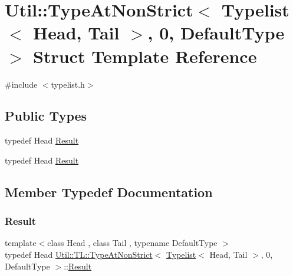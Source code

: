 \hypertarget{structUtil_1_1TL_1_1TypeAtNonStrict_3_01Typelist_3_01Head_00_01Tail_01_4_00_010_00_01DefaultType_01_4}{}\section{Util\+:\+:Type\+At\+Non\+Strict$<$ Typelist$<$ Head, Tail $>$, 0, Default\+Type $>$ Struct Template Reference}
\label{structUtil_1_1TL_1_1TypeAtNonStrict_3_01Typelist_3_01Head_00_01Tail_01_4_00_010_00_01DefaultType_01_4}


{\ttfamily \#include $<$typelist.\+h$>$}

\subsection*{Public Types}
\begin{DoxyCompactItemize}
\item 
typedef Head \mbox{\hyperlink{structUtil_1_1TL_1_1TypeAtNonStrict_3_01Typelist_3_01Head_00_01Tail_01_4_00_010_00_01DefaultType_01_4_a436fb34f639a42264d429c417d21785a}{Result}}
\item 
typedef Head \mbox{\hyperlink{structUtil_1_1TL_1_1TypeAtNonStrict_3_01Typelist_3_01Head_00_01Tail_01_4_00_010_00_01DefaultType_01_4_a436fb34f639a42264d429c417d21785a}{Result}}
\end{DoxyCompactItemize}


\subsection{Member Typedef Documentation}
\mbox{\label{structUtil_1_1TL_1_1TypeAtNonStrict_3_01Typelist_3_01Head_00_01Tail_01_4_00_010_00_01DefaultType_01_4_a436fb34f639a42264d429c417d21785a}} 
\subsubsection{\texorpdfstring{Result}{Result}\hspace{0.1cm}{\footnotesize\ttfamily [1/2]}}
{\footnotesize\ttfamily template$<$class Head , class Tail , typename Default\+Type $>$ \\
typedef Head \mbox{\hyperlink{structUtil_1_1TL_1_1TypeAtNonStrict}{Util\+::\+T\+L\+::\+Type\+At\+Non\+Strict}}$<$ \mbox{\hyperlink{structUtil_1_1Typelist}{Typelist}}$<$ Head, Tail $>$, 0, Default\+Type $>$\+::\mbox{\hyperlink{structUtil_1_1TL_1_1TypeAtNonStrict_3_01Typelist_3_01Head_00_01Tail_01_4_00_010_00_01DefaultType_01_4_a436fb34f639a42264d429c417d21785a}{Result}}}

